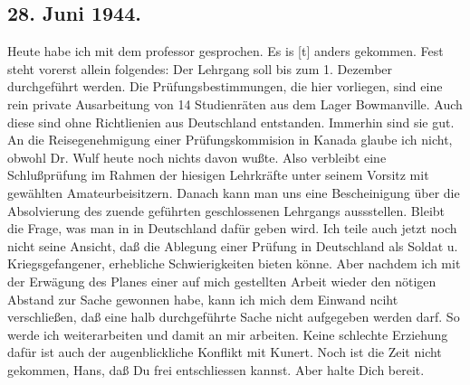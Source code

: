\subsection{28. Juni 1944.}

Heute habe ich  mit dem professor gesprochen.
Es is{\color{red} [t] } anders gekommen.
Fest steht vorerst allein folgendes: Der Lehrgang soll bis zum 1. Dezember durchgef\"{u}hrt werden.
Die Pr\"{u}fungsbestimmungen, die hier vorliegen, sind eine rein private Ausarbeitung von 14 Studienr\"{a}ten aus dem Lager Bowmanville.
Auch diese sind ohne Richtlienien aus Deutschland entstanden.
Immerhin sind sie gut.
An die Reisegenehmigung einer Pr\"{u}fungskommision in Kanada glaube ich nicht, obwohl Dr. Wulf heute noch nichts davon wu{\ss}te.
Also verbleibt eine Schlu{\ss}pr\"{u}fung im Rahmen der hiesigen Lehrkr\"{a}fte unter seinem Vorsitz mit gew\"{a}hlten Amateurbeisitzern.
Danach kann man uns eine Bescheinigung \"{u}ber die Absolvierung des zuende gef\"{u}hrten geschlossenen Lehrgangs aussstellen.
Bleibt die Frage, was man in in Deutschland daf\"{u}r geben wird.
Ich teile auch jetzt noch nicht seine Ansicht, da{\ss} die Ablegung einer Pr\"{u}fung in Deutschland als Soldat u. Kriegsgefangener, erhebliche Schwierigkeiten bieten k\"{o}nne.
Aber nachdem ich mit der Erw\"{a}gung des Planes einer auf mich gestellten Arbeit wieder den n\"{o}tigen Abstand zur Sache gewonnen habe, kann ich mich dem Einwand nciht verschlie{\ss}en, da{\ss} eine halb durchgef\"{u}hrte Sache nicht aufgegeben werden darf.
So werde ich weiterarbeiten und damit an mir arbeiten.
Keine schlechte Erziehung daf\"{u}r ist auch der augenblickliche Konflikt mit Kunert.
Noch ist die Zeit nicht gekommen, Hans, da{\ss} Du frei entschliessen kannst.
Aber halte Dich bereit.

\clearpage
